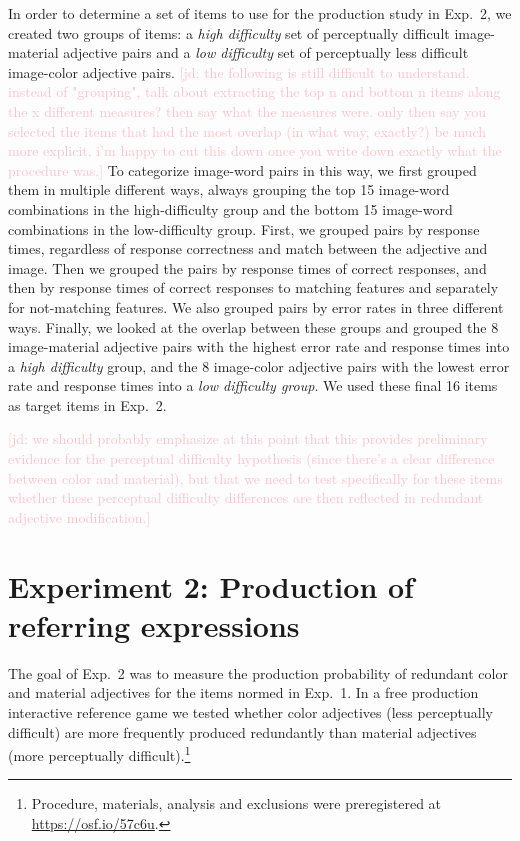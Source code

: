 \documentclass[12pt,letterpaper]{article}
\newcommand{\jd}[1]{\textcolor{Pink}{[jd: #1]}}
\begin{document}
In order to determine a set of items to use for the production study in Exp.~2, we created two groups of items:  a \textit{high difficulty} set of perceptually difficult image-material adjective pairs and a  \textit{low difficulty} set of perceptually less difficult image-color adjective pairs. \jd{the following is still difficult to understand. instead of "grouping", talk about extracting the top n and bottom n items along the x different measures? then say what the measures were. only then say you selected the items that had the most overlap (in what way, exactly?) be much more explicit. i'm happy to cut this down once you write down exactly what the procedure was.} To categorize  image-word pairs in this way, we first grouped them in multiple different ways, always grouping the top 15 image-word combinations in the high-difficulty group and the bottom 15 image-word combinations in the low-difficulty group. First, we grouped pairs by response times, regardless of response correctness and match between the adjective and image. Then we grouped the pairs by response times of correct responses, and then by response times of correct responses to matching features and separately for not-matching features. We also grouped pairs by error rates in three different ways. Finally, we looked at the overlap between these groups and grouped the 8 image-material adjective pairs with the highest error rate and response times into a \textit{high difficulty} group, and the 8 image-color adjective pairs with the lowest error rate and response times into a \textit{low difficulty group}. We used these final 16 items as target items in Exp.~2.

\jd{we should probably emphasize  at this point that this provides preliminary evidence for the perceptual difficulty hypothesis (since there's a clear difference between color and material), but that we need to test specifically for these items whether these perceptual difficulty differences are then reflected in redundant adjective modification.}

\section{Experiment 2: Production of referring expressions} 

The goal of Exp.~2 was to measure the production probability of redundant color and material adjectives for the items normed in Exp.~1. In a free production interactive reference game we tested whether color adjectives (less perceptually difficult) are more frequently produced redundantly than material adjectives (more perceptually difficult).\footnote{Procedure, materials, analysis and exclusions were preregistered at \href {https://osf.io/57c6u}{https://osf.io/57c6u}.}
\end{document}
